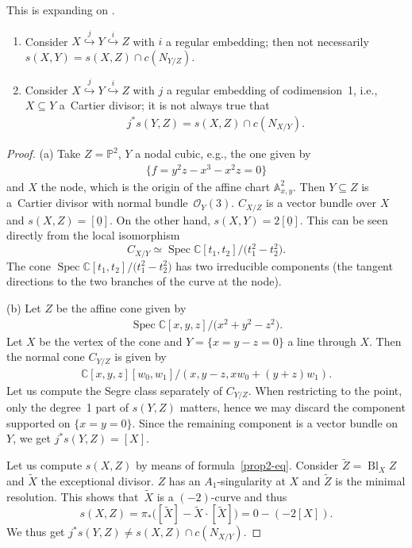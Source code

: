 \documentclass[pdftex]{sigma}
\numberwithin{equation}{section}
\newcommand{\Spec}{\operatorname{Spec}}
\begin{document}
\begin{Example}\label{segrecones}
 This is expanding on \cite[Example~4.2.8]{Fulton}.
\begin{enumerate}\itemsep=0pt
\item[(a)] Consider $X\overset{j}{\hookrightarrow} Y \overset{i}{\hookrightarrow} Z$ with $i$ a regular embedding; then not necessarily $s(X,Y)=s(X,Z)\cap c(N_{Y/Z})$.
\item[(b)] Consider $X\overset{j}{\hookrightarrow} Y \overset{i}{\hookrightarrow} Z$ with $j$ a regular embedding of codimension~1, i.e., $X\subseteq Y$ a~Cartier divisor; it is not always true that \begin{gather*}j^*s(Y,Z)=s(X,Z)\cap c(N_{X/Y}).\end{gather*}
\end{enumerate}
\end{Example}
\begin{proof} (a) Take $Z=\mathbb P^2$, $Y$ a nodal cubic, e.g., the one given by \begin{gather*}\big\{f=y^2z-x^3-x^2z=0\big\}\end{gather*} and $X$ the node, which is the origin of the affine chart $\mathbb A^2_{x,y}$. Then $Y\subseteq Z$ is a~Cartier divisor with normal bundle~$\mathcal O_Y(3)$. $C_{X/Z}$ is a vector bundle over $X$ and $s(X,Z)=[\underline 0].$ On the other hand, $s(X,Y)=2[\underline 0]$. This can be seen directly from the local isomorphism
\[C_{X/Y}\simeq \Spec\mathbb C[t_1,t_2]/\big(t_1^2-t_2^2\big).
\]
The cone $\Spec\mathbb C[t_1,t_2]/\big(t_1^2-t_2^2\big)$ has two irreducible components (the tangent directions to the two branches of the curve at the node).

(b) Let $Z$ be the affine cone given by \begin{gather*}\Spec \mathbb C[x,y,z]/\big(x^2+y^2-z^2\big).\end{gather*} Let $X$ be the vertex of the cone and $Y=\{x=y-z=0\}$ a line through $X$. Then the normal cone $C_{Y/Z}$ is given by \begin{gather*}\mathbb C[x,y,z][w_0,w_1]/(x,y-z,xw_0+(y+z)w_1).\end{gather*} Let us compute the Segre class separately of $C_{Y/Z}$. When restricting to the point, only the degree~1 part of $s(Y,Z)$ matters, hence we may discard the component supported on $\{x=y=0\}$. Since the remaining component is a vector bundle on $Y$, we get $j^*s(Y,Z)=[X]$.

Let us compute $s(X,Z)$ by means of formula~\eqref{prop2-eq}. Consider $\tilde Z=\operatorname{Bl}_X Z$ and $\tilde X$ the exceptional divisor. $Z$ has an $A_1$-singularity at $X$ and $\tilde Z$ is the minimal resolution. This shows that~$\tilde X$ is a $(-2)$-curve and thus
\[
 s(X,Z)=\pi_*\big([\tilde X]-\tilde X\cdot[\tilde X]\big)=0-(-2[X]).
\]
We thus get $j^*s(Y,Z)\neq s(X,Z)\cap c(N_{X/Y})$.
\end{proof}
\end{document}
